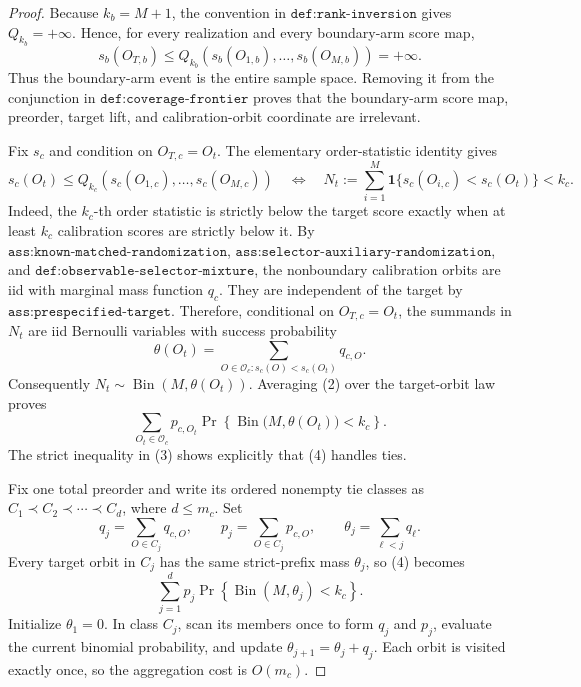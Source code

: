 \documentclass{article}
\begin{document}
\begin{proof}
Because \(k_b=M+1\), the convention in \(\texttt{def:rank-inversion}\) gives \(Q_{k_b}=+\infty\). Hence, for every realization and every boundary-arm score map,
\[
s_b(O_{T,b})\le Q_{k_b}(s_b(O_{1,b}),\ldots,s_b(O_{M,b}))=+\infty.
\tag{1}
\]
Thus the boundary-arm event is the entire sample space. Removing it from the conjunction in \(\texttt{def:coverage-frontier}\) proves that the boundary-arm score map, preorder, target lift, and calibration-orbit coordinate are irrelevant.

Fix \(s_c\) and condition on \(O_{T,c}=O_t\). The elementary order-statistic identity gives
\[
s_c(O_t)\le Q_{k_c}(s_c(O_{1,c}),\ldots,s_c(O_{M,c}))
\quad\Longleftrightarrow\quad
N_t:=\sum_{i=1}^M\mathbf 1\{s_c(O_{i,c})<s_c(O_t)\}<k_c.
\tag{2}
\]
Indeed, the \(k_c\)-th order statistic is strictly below the target score exactly when at least \(k_c\) calibration scores are strictly below it. By \(\texttt{ass:known-matched-randomization}\), \(\texttt{ass:selector-auxiliary-randomization}\), and \(\texttt{def:observable-selector-mixture}\), the nonboundary calibration orbits are iid with marginal mass function \(q_c\). They are independent of the target by \(\texttt{ass:prespecified-target}\). Therefore, conditional on \(O_{T,c}=O_t\), the summands in \(N_t\) are iid Bernoulli variables with success probability
\[
\theta(O_t)=\sum_{O\in\mathcal O_c:s_c(O)<s_c(O_t)}q_{c,O}.
\tag{3}
\]
Consequently \(N_t\sim\operatorname{Bin}(M,\theta(O_t))\). Averaging (2) over the target-orbit law proves
\[
\sum_{O_t\in\mathcal O_c}p_{c,O_t}
\Pr\!\left\{\operatorname{Bin}\bigl(M,\theta(O_t)\bigr)<k_c\right\}.
\tag{4}
\]
The strict inequality in (3) shows explicitly that (4) handles ties.

Fix one total preorder and write its ordered nonempty tie classes as \(C_1\prec C_2\prec\cdots\prec C_d\), where \(d\le m_c\). Set
\[
q_j=\sum_{O\in C_j}q_{c,O},\qquad
p_j=\sum_{O\in C_j}p_{c,O},\qquad
\theta_j=\sum_{\ell<j}q_\ell.
\tag{5}
\]
Every target orbit in \(C_j\) has the same strict-prefix mass \(\theta_j\), so (4) becomes
\[
\sum_{j=1}^d p_j\Pr\!\left\{\operatorname{Bin}(M,\theta_j)<k_c\right\}.
\tag{6}
\]
Initialize \(\theta_1=0\). In class \(C_j\), scan its members once to form \(q_j\) and \(p_j\), evaluate the current binomial probability, and update \(\theta_{j+1}=\theta_j+q_j\). Each orbit is visited exactly once, so the aggregation cost is \(O(m_c)\).


\end{proof}
\end{document}
